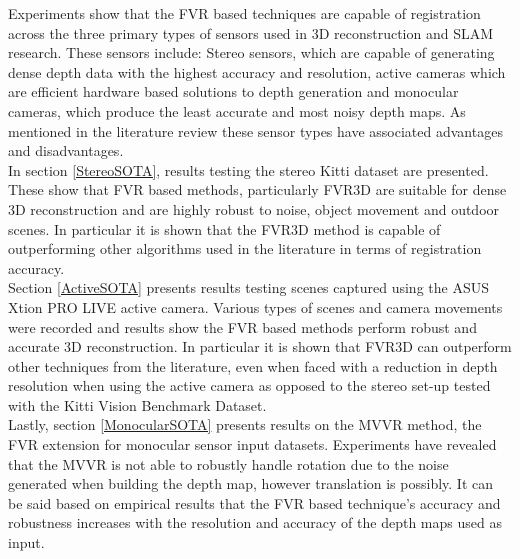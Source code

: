 


Experiments show that the FVR based techniques are capable of registration across the three primary types of sensors used in 3D reconstruction and SLAM research. These sensors include: Stereo sensors, which are capable of generating dense depth data with the highest accuracy and resolution, active cameras which are efficient hardware based solutions to depth generation and monocular cameras, which produce the least accurate and most noisy depth maps. As mentioned in the literature review these sensor types have associated advantages and disadvantages. \\

In section \ref{StereoSOTA}, results testing the stereo Kitti dataset are presented. These show that FVR based methods, particularly FVR3D are suitable for dense 3D reconstruction and are highly robust to noise, object movement and outdoor scenes. In particular it is shown that the FVR3D method is capable of outperforming other algorithms used in the literature in terms of registration accuracy. \\

Section \ref{ActiveSOTA} presents results testing scenes captured using the ASUS Xtion PRO LIVE active camera. Various types of scenes and camera movements were recorded and results show the FVR based methods perform robust and accurate 3D reconstruction. In particular it is shown that FVR3D can outperform other techniques from the literature, even when faced with a reduction in depth resolution when using the active camera as opposed to the stereo set-up tested with the Kitti Vision Benchmark Dataset.  \\

Lastly, section \ref{MonocularSOTA} presents results on the MVVR method, the FVR extension for monocular sensor input datasets. Experiments have revealed that the MVVR is not able to robustly handle rotation due to the noise generated when building the depth map, however translation is possibly. It can be said based on empirical results that the FVR based technique's accuracy and robustness increases with the resolution and accuracy of the depth maps used as input. \\
